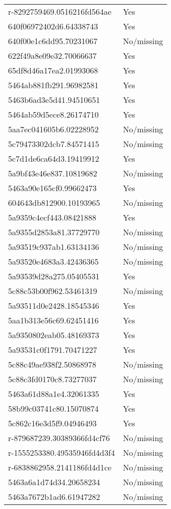 \begin{tabular}{ll}
r-8292759469.0516216fd564ae & Yes \\
640f06972402d6.64338743 & Yes \\
640f00e1c6dd95.70231067 & No/missing \\
622f49a8e09e32.70066637 & Yes \\
65df8d46a17ea2.01993068 & Yes \\
5464ab881fb291.96982581 & Yes \\
5463b6ad3e5d41.94510651 & Yes \\
5464ab59d5ece8.26174710 & Yes \\
5aa7ec041605b6.02228952 & No/missing \\
5c79473302dcb7.84571415 & No/missing \\
5c7d1de6ca64d3.19419912 & Yes \\
5a9bf43e46e837.10819682 & No/missing \\
5463a90e165cf0.99662473 & Yes \\
604643db812900.10193965 & No/missing \\
5a9359c4ecf443.08421888 & Yes \\
5a9355d2853a81.37729770 & No/missing \\
5a93519c937ab1.63134136 & No/missing \\
5a93520e4683a3.42436365 & No/missing \\
5a93539d28a275.05405531 & Yes \\
5c88c53b00f962.53461319 & No/missing \\
5a93511d0e2428.18545346 & Yes \\
5aa1b313e56c69.62451416 & Yes \\
5a9350802eab05.48169373 & Yes \\
5a93531c0f1791.70471227 & Yes \\
5c88c49ae938f2.50868978 & No/missing \\
5c88c3fd0170c8.73277037 & No/missing \\
5463a61d88a1e4.32061335 & Yes \\
58b99c03741c80.15070874 & Yes \\
5c862c16e3d5f9.04946493 & Yes \\
r-879687239.30389366fd4cf76 & No/missing \\
r-1555253380.49535946fd4d3f4 & No/missing \\
r-6838862958.2141186fd4d1ce & No/missing \\
5463a6a1d74d34.20658234 & No/missing \\
5463a7672b1ad6.61947282 & No/missing \\

\end{tabular}
